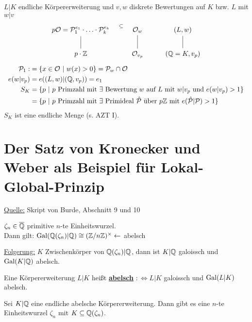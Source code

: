 \begin{Bem}
$L|K$ endliche Körpererweiterung und $v,w$ diskrete Bewertungen auf $K$ bzw. $L$ mit $w|v$
\[
\begin{tikzcd}
p \O = \mathcal{P}_1^{e_1} \cdot \ldots \cdot \mathcal{P}_k^{e_k} \arrow[draw=none, auto=false, sloped, r, "\subseteq"] & \O_w & (L,w)\\
p\cdot \Z \arrow[dash, u] & \O_{v_p} \arrow[dash, u] & (\Q=K,v_p) \arrow[dash, u]
\end{tikzcd}
\]
\begin{align*}
\mathcal{P}_1:&=\{x \in \mathcal{O} \ | \ w(x) >0\}=\mathcal{P}_w \cap \mathcal{O}\\
e(w|v_p)&=e((L,w)|(\mathbb{Q},v_p))=e_1\\
S_K&=\{p \ | \ p \text{ Primzahl mit } \exists \text{ Bewertung } w \text{ auf } L \text{ mit } w|v_p \text{ und } e(w|v_p)>1\}\\
&=\{p \ | \ p \text{ Primzahl mit } \exists \text{ Primideal } \hat{\mathcal{P}} \text{ über } p \mathbb{Z} \text{ mit } e(\hat{\mathcal{P}}|\mathcal{P})>1\}
\end{align*}
$S_K$ ist eine endliche Menge (s. AZT I).
\end{Bem}

\section{Der Satz von Kronecker und Weber als Beispiel für Lokal-Global-Prinzip}
\underline{Quelle:} Skript von Burde, Abschnitt 9 und 10\\
\begin{Err}
$\zeta_n \in \overline{\mathbb{Q}}$ primitive $n$-te Einheitswurzel.\\
Dann gilt: $\operatorname{Gal}(\mathbb{Q}(\zeta_n)|\mathbb{Q}) \cong (\mathbb{Z}/n\mathbb{Z})^\times \leftarrow $ abelsch
\end{Err}

\underline{Folgerung:} $K$ Zwischenkörper von $\mathbb{Q}(\zeta_n)|\mathbb{Q}$, dann ist $K|\mathbb{Q}$ galoissch und $\operatorname{Gal}(K|\mathbb{Q})$ abelsch.

\begin{defi}
Eine Körpererweiterung $L|K$ heißt \textbf{\underline{abelsch}} $:\iff L|K$ galoissch und $\operatorname{Gal}(L|K)$ abelsch.
\end{defi}

\begin{Satz}
Sei $K|\mathbb{Q}$ eine endliche abelsche Körpererweiterung. Dann gibt es eine $n$-te Einheitswurzel $\zeta_n$ mit $K \subseteq \mathbb{Q}(\zeta_n)$.
\end{Satz}

